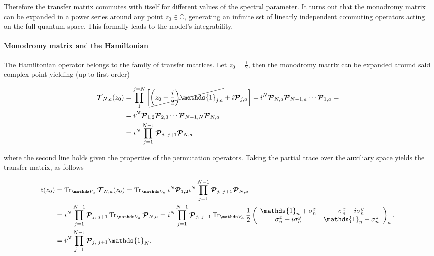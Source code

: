 \documentclass{homework}
\begin{document}
Therefore the transfer matrix commutes with itself for different values of the spectral parameter. It turns out that the monodromy matrix can be expanded in a power series around any point $z_0 \in \mathds{C}$, generating an infinite set of linearly independent commuting operators acting on the full quantum space. This formally leads to the model's integrability. \\

\paragraph{\textbf{Monodromy matrix and the Hamiltonian}}

The Hamiltonian operator belongs to the family of transfer matrices. Let $z_0 = \frac{i}{2}$, then the monodromy matrix can be expanded around said complex point yielding (up to first order)

\begin{equation} 
    \begin{split}
         \bmt_{N,a}(z_0) &= \prod_1^{j=N} \bigg[ \cancel{\bigg(z_0-\frac{i}{2}\bigg) \mathds{1}_{j, a}} + i \bm{\mathcal{P}}_{j, a}\bigg] = i^N \bm{\mathcal{P}}_{N, a} \bm{\mathcal{P}}_{N-1, a} \cdots \bm{\mathcal{P}}_{1, a} = \\
         &= i^N \bm{\mathcal{P}}_{1, 2} \bm{\mathcal{P}}_{2, 3} \cdots \bm{\mathcal{P}}_{N-1, N} \bm{\mathcal{P}}_{N, a}\\
         &= i^N \prod_{j=1}^{N-1} \bm{\mathcal{P}}_{j, \blanky j+1} \bm{\mathcal{P}}_{N, a}
    \end{split}
\end{equation}

where the second line holds given the properties of the permutation operators. Taking the partial trace over the auxiliary space yields the transfer matrix, as follows 

\begin{equation}
    \begin{split}
        \mathfrak{t}(z_0) &= \Tr_{\vds_a}  \bmt_{N,a}(z_0) = \Tr_{\vds_a} i^N \bm{\mathcal{P}}_{1, 2} i^N \prod_{j=1}^{N-1} \bm{\mathcal{P}}_{j, \blanky j+1} \bm{\mathcal{P}}_{N, a} \\
        &= i^N \prod_{j=1}^{N-1} \bm{\mathcal{P}}_{j, \blanky j+1}
        \Tr_{\vds_a} \bm{\mathcal{P}}_{N, a}    = i^N \prod_{j=1}^{N-1} \bm{\mathcal{P}}_{j, \blanky j+1} \Tr_{\vds_a} \frac{1}{2}\left(\begin{array}{cc}
       \mathds{1}_n + \sigma^{z}_{n} &  \sigma^{x}_{n} - i\sigma^{y}_{n} \\
       \sigma^{x}_{n} + i\sigma^{y}_{n}  & \mathds{1}_n - \sigma^{z}_{n} \\
        \end{array}\right)_a. \\
        &= i^N \prod_{j=1}^{N-1} \bm{\mathcal{P}}_{j, \blanky j+1} \mathds{1}_N.
    \end{split}
\end{equation}
\end{document}
